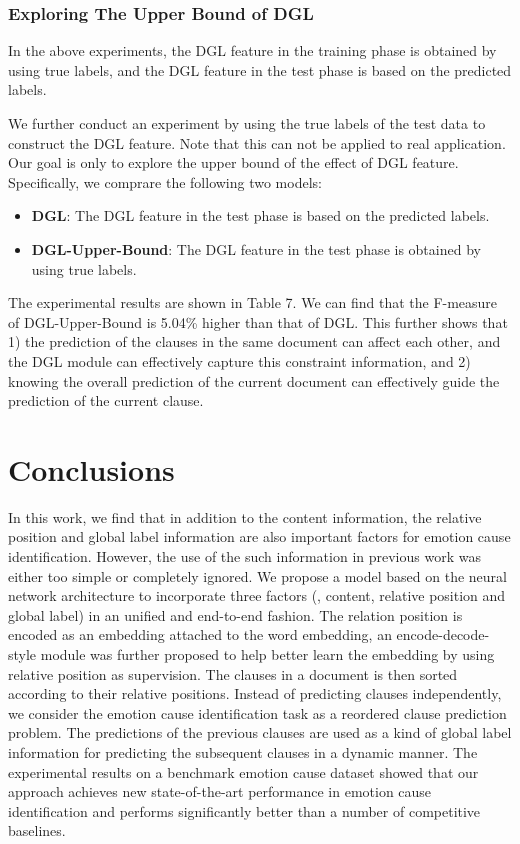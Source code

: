 \documentclass[letterpaper]{article} \usepackage{aaai19}  \usepackage{times}  \usepackage{helvet}  \usepackage{courier}  \usepackage{url}  \usepackage{graphicx}  \frenchspacing  \setlength{\pdfpagewidth}{8.5in}  \setlength{\pdfpageheight}{11in}  \setcounter{secnumdepth}{0}
\begin{document}
\subsubsection{Exploring The Upper Bound of DGL}

In the above experiments, the DGL feature in the training phase is obtained by using true labels, and the DGL feature in the test phase is based on the predicted labels.

We further conduct an experiment by using the true labels of the test data to construct the DGL feature. Note that this can not be applied to real application. Our goal is only to explore the upper bound of the effect of DGL feature. Specifically, we comprare the following two models:

\begin{itemize}
	\item \textbf{DGL}: The DGL feature in the test phase is based on the predicted labels.
	\item \textbf{DGL-Upper-Bound}: The DGL feature in the test phase is obtained by using true labels.
\end{itemize}



The experimental results are shown in Table 7. We can find that the F-measure of DGL-Upper-Bound is 5.04\% higher than that of DGL. This further shows that 1) the prediction of the clauses in the same document can affect each other, and the DGL module can effectively capture this constraint information, and 2) knowing the overall prediction of the current document can effectively guide the prediction of the current clause.



\section{Conclusions}

In this work, we find that in addition to the content information, the relative position and global label information are also important factors for emotion cause identification. However, the use of the such information in previous work was either too simple or completely ignored. We propose a model based on the neural network architecture to incorporate three factors (, content, relative position and global label) in an unified and end-to-end fashion. The relation position is encoded as an embedding attached to the word embedding, an encode-decode-style module was further proposed to help better learn the embedding by using relative position as supervision. The clauses in a document is then sorted according to their relative positions. Instead of predicting clauses independently, we consider the emotion cause identification task as a reordered clause prediction problem. The predictions of the previous clauses are used as a kind of global label information for predicting the subsequent clauses in a dynamic manner. The experimental results on a benchmark emotion cause dataset showed that our approach achieves new state-of-the-art performance in emotion cause identification and performs significantly better than a number of competitive baselines.
\end{document}
